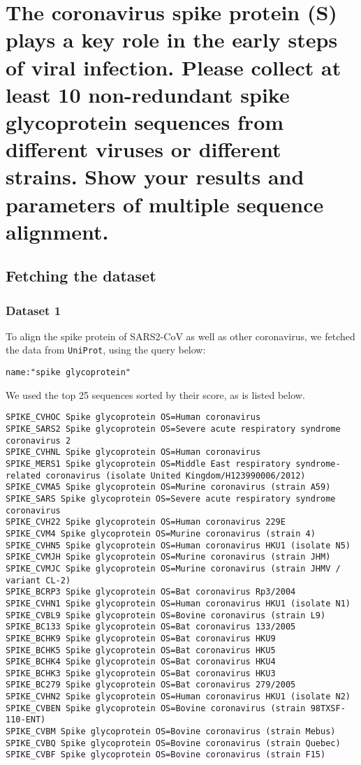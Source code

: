 \section{The coronavirus spike protein (S) plays a key role in the early steps of viral infection. Please collect at least 10 non-redundant spike glycoprotein sequences from different viruses or different strains.  Show your results and parameters of multiple sequence alignment.}

\subsection{Fetching the dataset}
\subsubsection{Dataset 1}
To align the spike protein of SARS2-CoV as well as other coronavirus, 
we fetched the data from \texttt{UniProt}, using the query below:

\lstinline{name:"spike glycoprotein"}

We used the top 25 sequences sorted by their score, as is listed below.

\begin{lstlisting}
SPIKE_CVHOC Spike glycoprotein OS=Human coronavirus
SPIKE_SARS2 Spike glycoprotein OS=Severe acute respiratory syndrome coronavirus 2
SPIKE_CVHNL Spike glycoprotein OS=Human coronavirus
SPIKE_MERS1 Spike glycoprotein OS=Middle East respiratory syndrome-related coronavirus (isolate United Kingdom/H123990006/2012)
SPIKE_CVMA5 Spike glycoprotein OS=Murine coronavirus (strain A59)
SPIKE_SARS Spike glycoprotein OS=Severe acute respiratory syndrome coronavirus
SPIKE_CVH22 Spike glycoprotein OS=Human coronavirus 229E
SPIKE_CVM4 Spike glycoprotein OS=Murine coronavirus (strain 4)
SPIKE_CVHN5 Spike glycoprotein OS=Human coronavirus HKU1 (isolate N5)
SPIKE_CVMJH Spike glycoprotein OS=Murine coronavirus (strain JHM)
SPIKE_CVMJC Spike glycoprotein OS=Murine coronavirus (strain JHMV / variant CL-2)
SPIKE_BCRP3 Spike glycoprotein OS=Bat coronavirus Rp3/2004
SPIKE_CVHN1 Spike glycoprotein OS=Human coronavirus HKU1 (isolate N1)
SPIKE_CVBL9 Spike glycoprotein OS=Bovine coronavirus (strain L9)
SPIKE_BC133 Spike glycoprotein OS=Bat coronavirus 133/2005
SPIKE_BCHK9 Spike glycoprotein OS=Bat coronavirus HKU9
SPIKE_BCHK5 Spike glycoprotein OS=Bat coronavirus HKU5
SPIKE_BCHK4 Spike glycoprotein OS=Bat coronavirus HKU4
SPIKE_BCHK3 Spike glycoprotein OS=Bat coronavirus HKU3
SPIKE_BC279 Spike glycoprotein OS=Bat coronavirus 279/2005
SPIKE_CVHN2 Spike glycoprotein OS=Human coronavirus HKU1 (isolate N2)
SPIKE_CVBEN Spike glycoprotein OS=Bovine coronavirus (strain 98TXSF-110-ENT)
SPIKE_CVBM Spike glycoprotein OS=Bovine coronavirus (strain Mebus)
SPIKE_CVBQ Spike glycoprotein OS=Bovine coronavirus (strain Quebec)
SPIKE_CVBF Spike glycoprotein OS=Bovine coronavirus (strain F15)
\end{lstlisting}

